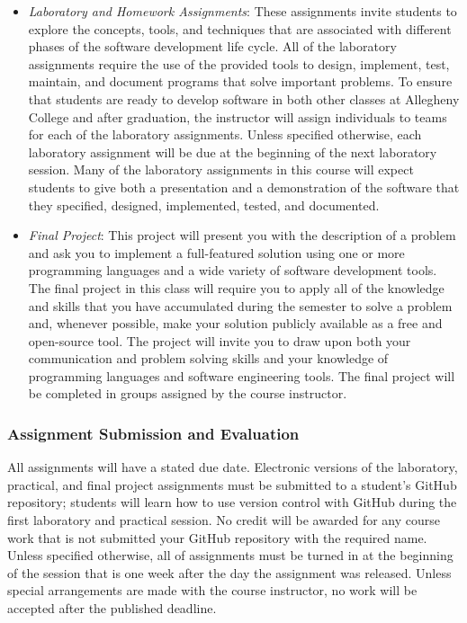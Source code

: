 \documentclass[11pt]{article}
\begin{document}
\begin{itemize}
  \item {\em Laboratory and Homework Assignments\/}: These assignments invite students to explore the concepts, tools,
    and techniques that are associated with different phases of the software development life cycle. All of the
    laboratory assignments require the use of the provided tools to design, implement, test, maintain, and document
    programs that solve important problems. To ensure that students are ready to develop software in both other classes
    at Allegheny College and after graduation, the instructor will assign individuals to teams for each of the
    laboratory assignments. Unless specified otherwise, each laboratory assignment will be due at the beginning of the
    next laboratory session. Many of the laboratory assignments in this course will expect students to give both a
    presentation and a demonstration of the software that they specified, designed, implemented, tested, and documented.

  \item {\em Final Project\/}: This project will present you with the description of a problem and ask you to implement
    a full-featured solution using one or more programming languages and a wide variety of software development tools.
    The final project in this class will require you to apply all of the knowledge and skills that you have accumulated
    during the semester to solve a problem and, whenever possible, make your solution publicly available as a free and
    open-source tool. The project will invite you to draw upon both your communication and problem solving skills and
    your knowledge of programming languages and software engineering tools. The final project will be completed in
    groups assigned by the course instructor.

\end{itemize}

\subsubsection*{Assignment Submission and Evaluation}

All assignments will have a stated due date. Electronic versions of the laboratory, practical, and final project
assignments must be submitted to a student's GitHub repository; students will learn how to use version control with
GitHub during the first laboratory and practical session. No credit will be awarded for any course work that is not
submitted your GitHub repository with the required name. Unless specified otherwise, all of assignments must be turned
in at the beginning of the session that is one week after the day the assignment was released. Unless special
arrangements are made with the course instructor, no work will be accepted after the published deadline.
\end{document}
